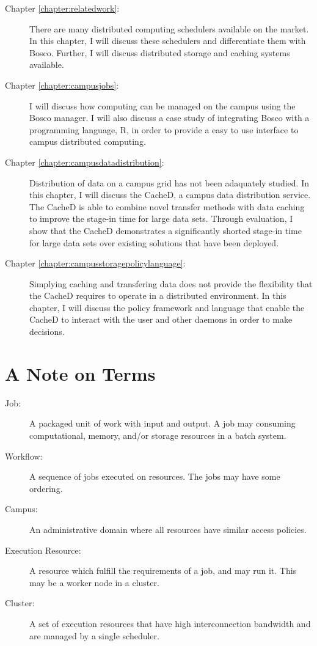 \begin{description}
	\item[Chapter \ref{chapter:relatedwork}:]  There are many distributed computing schedulers available on the market.  In this chapter, I will discuss these schedulers and differentiate them with Bosco.  Further, I will discuss distributed storage and caching systems available.
	
	\item[Chapter \ref{chapter:campusjobs}:] I will discuss how computing can be managed on the campus using the Bosco manager.  I will also discuss a case study of integrating Bosco with a programming language, R, in order to provide a easy to use interface to campus distributed computing.
	
	\item[Chapter \ref{chapter:campusdatadistribution}:] Distribution of data on a campus grid has not been adaquately studied.  In this chapter, I will discuss the CacheD, a campus data distribution service.  The CacheD is able to combine novel transfer methods with data caching to improve the stage-in time for large data sets.  Through evaluation, I show that the CacheD demonstrates a significantly shorted stage-in time for large data sets over existing solutions that have been deployed.
	
	\item[Chapter \ref{chapter:campusstoragepolicylanguage}:]  
	Simplying caching and transfering data does not provide the flexibility that the CacheD requires to operate in a distributed environment.  In this chapter, I will discuss the policy framework and language that enable the CacheD to interact with the user and other daemons in order to make decisions.
\end{description}


\newpage
\section{A Note on Terms}

\begin{description}
	\item[Job:] A packaged unit of work with input and output.  A job may consuming computational, memory, and/or storage resources in a batch system.
	\item[Workflow:] A sequence of jobs executed on resources.  The jobs may have some ordering.
	\item[Campus:] An administrative domain where all resources have similar access policies.
	\item[Execution Resource:] A resource which fulfill the requirements of a job, and may run it.  This may be a worker node in a cluster.
	\item[Cluster:] A set of execution resources that have high interconnection bandwidth and are managed by a single scheduler.
\end{description}



